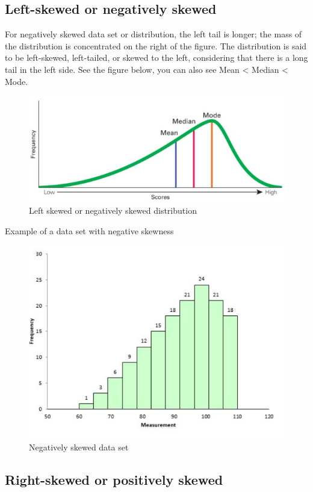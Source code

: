 \documentclass[
]{book}
\begin{document}
\hypertarget{left-skewed-or-negatively-skewed}{%
\subsection{Left-skewed or negatively skewed}\label{left-skewed-or-negatively-skewed}}

For negatively skewed data set or distribution, the left tail is longer;
the mass of the distribution is concentrated on the right of the figure.
The distribution is said to be left-skewed, left-tailed, or skewed to
the left, considering that there is a long tail in the left side. See
the figure below, you can also see Mean \textless{} Median \textless{} Mode.

\begin{figure}

{\centering \includegraphics[width=0.5\linewidth]{images/image5_5} 

}

\caption{Left skewed or negatively skewed distribution}\label{fig:sk1}
\end{figure}

Example of a data set with negative skewness

\begin{figure}

{\centering \includegraphics[width=0.5\linewidth]{images/image6_5} 

}

\caption{Negatively skewed data set}\label{fig:sk3}
\end{figure}

\hypertarget{right-skewed-or-positively-skewed}{%
\subsection{Right-skewed or positively skewed}\label{right-skewed-or-positively-skewed}}
\end{document}
